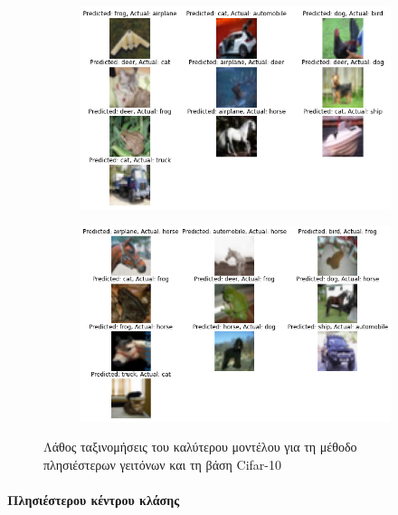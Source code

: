 \documentclass[a4paper]{article}
\begin{document}
\begin{figure}[H]
    \centering

    \begin{subfigure}[t]{0.48\linewidth}
    \includegraphics[width=\linewidth]{cifar/wrong_results_knn_1.png}
    \end{subfigure}
    \begin{subfigure}[t]{0.48\linewidth}
    \includegraphics[width=\linewidth]{cifar/wrong_results_knn_2.png}
    \end{subfigure}

    \caption{Λάθος ταξινομήσεις του καλύτερου μοντέλου για τη μέθοδο
    πλησιέστερων γειτόνων και τη βάση Cifar-10}
    \label{fig:cifar_wrong_knn}
\end{figure}

\paragraph{Πλησιέστερου κέντρου κλάσης}
\end{document}

